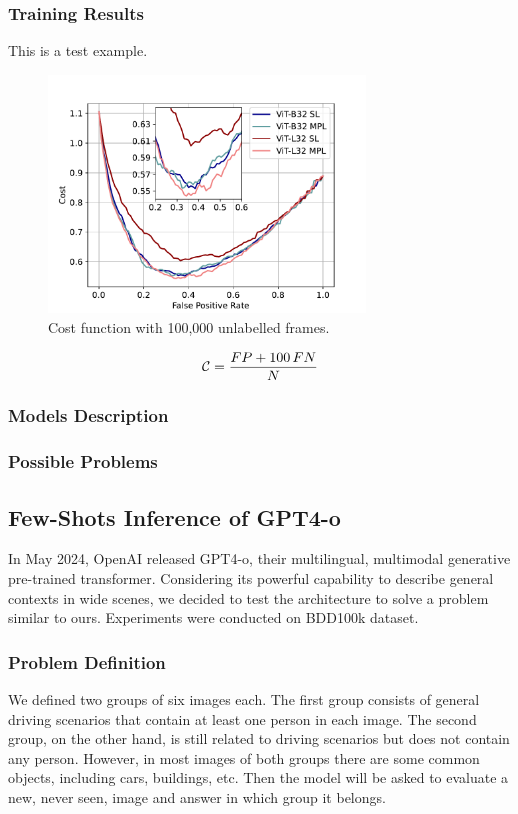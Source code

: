 \subsubsection{Training Results}
This is a test example.
\begin{figure}[h]
    \centering
    \includegraphics[width=0.75\textwidth]{images/bdd100k/training/cost.pdf}
    \caption[Cost function with 100,000 unlabelled frames.]
    {Cost function with 100,000 unlabelled frames.}
    \label{fig:cost_100k_ul}
\end{figure}
\begin{equation}
\centering
\mathcal{C} = \frac{FP + 100 \, FN}{N}
\end{equation}

\subsubsection{Models Description}

\subsubsection{Possible Problems}

\subsection{Few-Shots Inference of GPT4-o}
In May 2024, OpenAI released GPT4-o, their multilingual, multimodal generative 
pre-trained transformer. Considering its powerful capability to describe general 
contexts in wide scenes, we decided to test the architecture to solve a problem 
similar to ours. Experiments were conducted on BDD100k dataset.

\subsubsection{Problem Definition}
We defined two groups of six images each. The first group consists of general 
driving scenarios that contain at least one person in each image. 
The second group, on the other hand, is still related to driving scenarios but 
does not contain any person. However, in most images of both groups there are 
some common objects, including cars, buildings, etc.
Then the model will be asked to evaluate a new, never seen, image and answer 
in which group it belongs.

